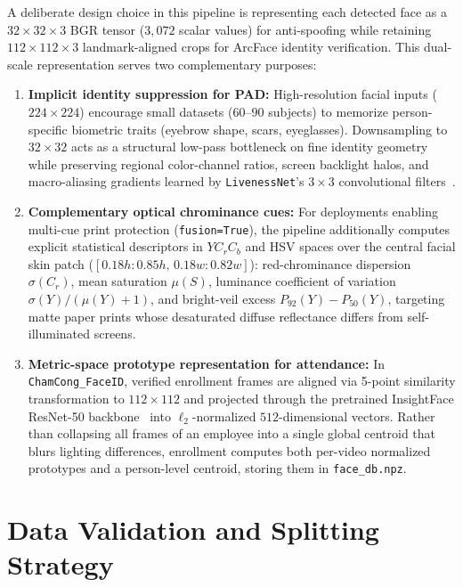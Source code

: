 A deliberate design choice in this pipeline is representing each detected face as a $32\times32\times3$ BGR tensor ($3{,}072$ scalar values) for anti-spoofing while retaining $112\times112\times3$ landmark-aligned crops for ArcFace identity verification. This dual-scale representation serves two complementary purposes:
\begin{enumerate}
    \item \textbf{Implicit identity suppression for PAD:} High-resolution facial inputs ($224\times224$) encourage small datasets ($60$--$90$ subjects) to memorize person-specific biometric traits (eyebrow shape, scars, eyeglasses). Downsampling to $32\times32$ acts as a structural low-pass bottleneck on fine identity geometry while preserving regional color-channel ratios, screen backlight halos, and macro-aliasing gradients learned by \texttt{LivenessNet}'s $3\times3$ convolutional filters~\cite{wang2022patchnet}.
    \item \textbf{Complementary optical chrominance cues:} For deployments enabling multi-cue print protection (\texttt{fusion=True}), the pipeline additionally computes explicit statistical descriptors in $YC_rC_b$ and HSV spaces over the central facial skin patch ($[0.18h : 0.85h,\, 0.18w : 0.82w]$): red-chrominance dispersion $\sigma(C_r)$, mean saturation $\mu(S)$, luminance coefficient of variation $\sigma(Y)/(\mu(Y)+1)$, and bright-veil excess $P_{92}(Y) - P_{50}(Y)$, targeting matte paper prints whose desaturated diffuse reflectance differs from self-illuminated screens.
    \item \textbf{Metric-space prototype representation for attendance:} In \texttt{ChamCong\_FaceID}, verified enrollment frames are aligned via 5-point similarity transformation to $112\times112$ and projected through the pretrained InsightFace ResNet-50 backbone~\cite{deng2019arcface} into $\ell_2$-normalized $512$-dimensional vectors. Rather than collapsing all frames of an employee into a single global centroid that blurs lighting differences, enrollment computes both per-video normalized prototypes and a person-level centroid, storing them in \texttt{face\_db.npz}.
\end{enumerate}

\section{Data Validation and Splitting Strategy}
\label{sec:splitting_strategy}

